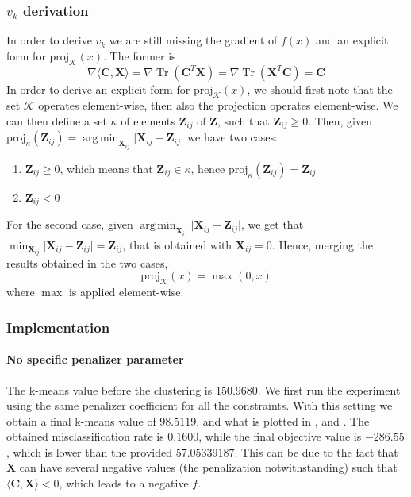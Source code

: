 \documentclass[12pt]{article}
\DeclareMathOperator*{\argmin}{arg\,min}
\DeclareMathOperator*{\tr}{Tr}
\newcommand{\boldZ}{\mathbf{Z}}
\newcommand{\boldX}{\mathbf{X}}
\newcommand{\boldC}{\mathbf{C}}
\newcommand*{\proj}{\text{proj}}
\begin{document}
\subsubsection{\texorpdfstring{$v_{k}$}{Lg} derivation}
In order to derive $v_k$ we are still missing the gradient of $f(x)$ and an explicit form for $\proj_{\mathcal{K}}(x)$. The former is
\begin{equation}
    \nabla \langle \boldC, \boldX \rangle = \nabla \tr(\boldC^T\boldX) = \nabla \tr(\boldX^T\boldC) = \boldC
\end{equation}
In order to derive an explicit form for $\proj_{\mathcal{K}}(x)$, we should first note that the set $\mathcal{K}$ operates element-wise, then also the projection operates element-wise. We can then define a set $\kappa$ of elements $\boldZ_{ij}$ of $\boldZ$, such that $\boldZ_{ij} \geq 0$. Then, given $\proj_{\kappa}(\boldZ_{ij}) = \argmin_{\boldX_{ij}} \lvert \boldX_{ij} - \boldZ_{ij} \rvert$ we have two cases:
\begin{enumerate}
    \item $\boldZ_{ij} \geq 0$, which means that $\boldZ_{ij} \in \kappa$, hence $\proj_{\kappa}(\boldZ_{ij}) = \boldZ_{ij}$
    \item $\boldZ_{ij} < 0$
\end{enumerate}
For the second case, given $\argmin_{\boldX_{ij}} \lvert \boldX_{ij} - \boldZ_{ij} \rvert$, we get that $\min_{\boldX_{ij}} \lvert \boldX_{ij} - \boldZ_{ij} \rvert = \boldZ_{ij}$, that is obtained with $\boldX_{ij} = 0$. Hence, merging the results obtained in the two cases,
\begin{equation}
    \proj_{\mathcal{K}}(x) = \max(0, x)
\end{equation}
where $\max$ is applied element-wise.

\subsubsection{Implementation}
\paragraph{No specific penalizer parameter}
The k-means value before the clustering is $150.9680$.
We first run the experiment using the same penalizer coefficient for all the constraints. With this setting we obtain a final k-means value of $98.5119$, and what is plotted in ,  and . The obtained misclassification rate is $0.1600$, while the final objective value is $-286.55$, which is lower than the provided $57.05339187$. This can be due to the fact that $\boldX$ can have several negative values (the penalization notwithstanding) such that $\langle \boldC, \boldX \rangle < 0$, which leads to a negative $f$.
\end{document}
